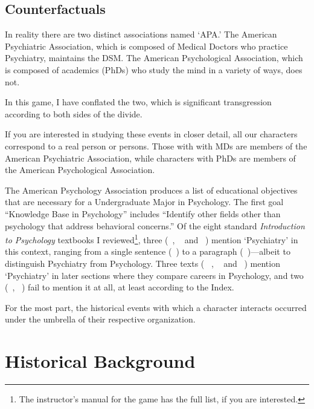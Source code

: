 \begin{refsection}
\section{Counterfactuals}
\label{counterfactuals}

In reality there are two distinct associations named `APA.' The American Psychiatric Association, which is composed of Medical Doctors who practice Psychiatry, maintains the DSM. The American Psychological Association, which is composed of academics (PhDs) who study the mind in a variety of ways, does not. 

In this game, I have conflated the two, which is significant transgression according to both sides of the divide. 

If you are interested in studying these events in closer detail, all our characters correspond to a real person or persons. Those with with MDs are members of the American Psychiatric Association, while characters with PhDs are members of the American Psychological Association. 

The American Psychology Association produces a list of educational objectives that are necessary for a Undergraduate Major in Psychology. The first goal “Knowledge Base in Psychology” includes “Identify other fields other than psychology that address behavioral concerns.” Of the eight standard \emph{Introduction to Psychology} textbooks I reviewed\footnote{The instructor’s manual for the game has the full list, if you are interested.}, three (~\citep{Myers:2015ws}, ~\citep{Hockenbury:2014ws} and ~\citep{Zimbardo:2012uz}) mention ‘Psychiatry’ in this context, ranging from a single sentence (~\citep{Myers:2015ws}) to a paragraph (~\citep{Zimbardo:2012uz})---albeit to distinguish Psychiatry from Psychology. Three texts ( ~\citep{Gazzaniga:2018tq}, ~\citep{Cervone:2015ud} and ~\citep{Cacioppo:2018we}) mention ‘Psychiatry’ in later sections where they compare careers in Psychology, and two (~\citep{Lilienfeld:2014ws}, ~\citep{Rathus:2012uz}) fail to mention it at all, at least according to the Index.

For the most part, the historical events with which a character interacts occurred under the umbrella of their respective organization.

\pagebreak 

\chapter{Historical Background}
\label{historicalbackground}


\end{refsection}
